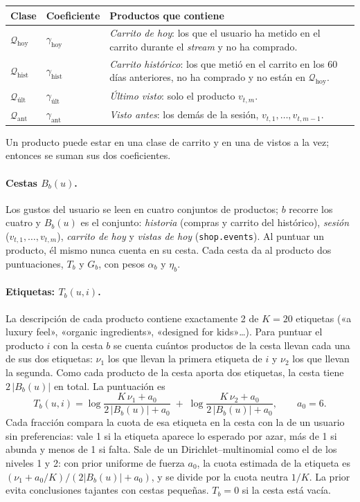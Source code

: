 \documentclass[11pt,a4paper]{article}
\newcommand{\cod}[1]{\texttt{#1}}
\begin{document}
\begin{center}
\begin{tabular}{llp{9.2cm}}
\toprule
Clase & Coeficiente & Productos que contiene\\
\midrule
$\mathcal Q_{\text{hoy}}$ & $\gamma_{\text{hoy}}$ & \emph{Carrito de hoy}: los que el usuario ha metido en el carrito durante el \emph{stream} y no ha comprado.\\
$\mathcal Q_{\text{hist}}$ & $\gamma_{\text{hist}}$ & \emph{Carrito histórico}: los que metió en el carrito en los 60 días anteriores, no ha comprado y no están en $\mathcal Q_{\text{hoy}}$.\\
$\mathcal Q_{\text{últ}}$ & $\gamma_{\text{últ}}$ & \emph{Último visto}: solo el producto $v_{t,m}$.\\
$\mathcal Q_{\text{ant}}$ & $\gamma_{\text{ant}}$ & \emph{Visto antes}: los demás de la sesión, $v_{t,1},\dots,v_{t,m-1}$.\\
\bottomrule
\end{tabular}
\end{center}

Un producto puede estar en una clase de carrito y en una de vistos a la vez; entonces se suman sus dos
coeficientes.

\paragraph{Cestas $B_b(u)$.} Los gustos del usuario se leen en cuatro conjuntos de productos; $b$
recorre los cuatro y $B_b(u)$ es el conjunto: \emph{historia} (compras y carrito del histórico),
\emph{sesión} ($v_{t,1},\dots,v_{t,m}$), \emph{carrito de hoy} y \emph{vistas de hoy}
(\cod{shop.events}). Al puntuar un producto, él mismo nunca cuenta en su cesta. Cada cesta da al producto
dos puntuaciones, $T_b$ y $G_b$, con pesos $\alpha_b$ y $\eta_b$.

\paragraph{Etiquetas: $T_b(u,i)$.} La descripción de cada producto contiene exactamente 2 de $K=20$
etiquetas («a luxury feel», «organic ingredients», «designed for kids»\dots). Para puntuar el producto
$i$ con la cesta $b$ se cuenta cuántos productos de la cesta llevan cada una de sus dos etiquetas:
$\nu_1$ los que llevan la primera etiqueta de $i$ y $\nu_2$ los que llevan la segunda. Como cada producto
de la cesta aporta dos etiquetas, la cesta tiene $2\,|B_b(u)|$ en total. La puntuación es
\[
T_b(u,i)=\log\frac{K\,\nu_1+a_0}{2\,|B_b(u)|+a_0}\;+\;\log\frac{K\,\nu_2+a_0}{2\,|B_b(u)|+a_0},
\qquad a_0=6 .
\]
Cada fracción compara la cuota de esa etiqueta en la cesta con la de un usuario sin preferencias: vale
1 si la etiqueta aparece lo esperado por azar, más de 1 si abunda y menos de 1 si falta. Sale de un
Dirichlet--multinomial como el de los niveles 1 y 2: con prior uniforme de fuerza $a_0$, la cuota
estimada de la etiqueta es $(\nu_1+a_0/K)/(2|B_b(u)|+a_0)$, y se divide por la cuota neutra $1/K$. La
prior evita conclusiones tajantes con cestas pequeñas. $T_b=0$ si la cesta está vacía.
\end{document}
